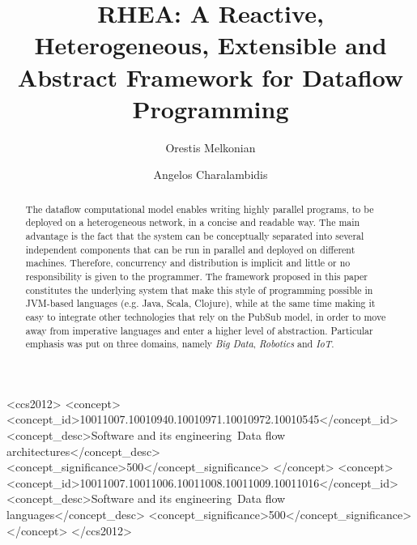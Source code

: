 \documentclass[sigplan,review,anonymous,screen]{acmart}
\begin{document}


\title[RHEA]{RHEA: A Reactive, Heterogeneous, Extensible and Abstract Framework for Dataflow Programming}

\author{Orestis Melkonian}

\author{Angelos Charalambidis}

\begin{abstract}
The dataflow computational model enables writing highly parallel programs,
to be deployed on a heterogeneous network, in a concise and readable way.
The main advantage is the fact that the system can be conceptually separated
into several independent components that can be run in parallel and deployed on
different machines. Therefore, concurrency and distribution is implicit and
little or no responsibility is given to the programmer. The framework proposed
in this paper constitutes the underlying system that make this style of
programming possible in JVM-based languages (e.g. Java, Scala, Clojure),
while at the same time making it easy to integrate other technologies that rely
on the PubSub model, in order to move away from imperative languages and enter
a higher level of abstraction. Particular emphasis was put on three domains,
namely \textit{Big Data}, \textit{Robotics} and \textit{IoT}.
\end{abstract}

\begin{CCSXML} <ccs2012> <concept>
<concept_id>10011007.10010940.10010971.10010972.10010545</concept_id>
<concept_desc>Software and its engineering~Data flow
architectures</concept_desc> <concept_significance>500</concept_significance>
</concept> <concept>
<concept_id>10011007.10011006.10011008.10011009.10011016</concept_id>
<concept_desc>Software and its engineering~Data flow languages</concept_desc>
<concept_significance>500</concept_significance> </concept> </ccs2012>
\end{CCSXML}

\end{document}
